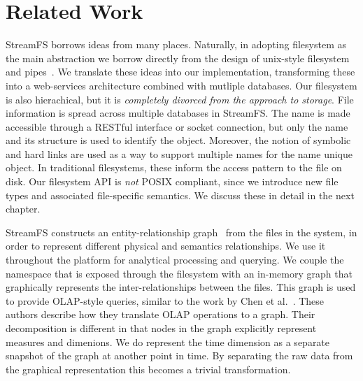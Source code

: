 \section{Related Work}
StreamFS borrows ideas from many places.  Naturally, in adopting filesystem as the main abstraction we borrow directly
from the design of unix-style filesystem and pipes~\cite{Ritchie74theunix}.  We translate these ideas into 
our implementation, transforming these into a web-services architecture combined with mutliple databases.
Our filesystem is also hierachical, but it is \emph{completely divorced from the approach to storage}.  File information is
spread across multiple databases in StreamFS.  The name is made accessible through a RESTful interface or socket connection, but
only the name and its structure is used to identify the object.  Moreover, the notion of symbolic and hard links are
used as a way to support multiple names for the name unique object.  In traditional filesystems, these inform
the access pattern to the file on disk.  Our filesystem API is \emph{not} POSIX compliant, since we introduce new file types
and associated file-specific semantics.  We discuss these in detail in the next chapter.

StreamFS constructs an entity-relationship graph~\cite{Chen76theentity-relationship} from the files in the system, in order to 
represent different physical and semantics relationships.  We use it throughout the platform for analytical processing and querying.
We couple the namespace that is exposed through the filesystem with an in-memory graph that graphically represents the inter-relationships
between the files.  This graph is used to provide OLAP-style queries, similar to the work by Chen et al.~\cite{Chen2008_olapgraph}.  
These authors describe how they translate OLAP operations to a graph.  Their decomposition is different in that nodes in the graph 
explicitly represent measures and dimenions.  We do represent the time dimension as a separate snapshot of the graph at another
point in time.  By separating the raw data from the graphical representation this becomes a trivial transformation.

